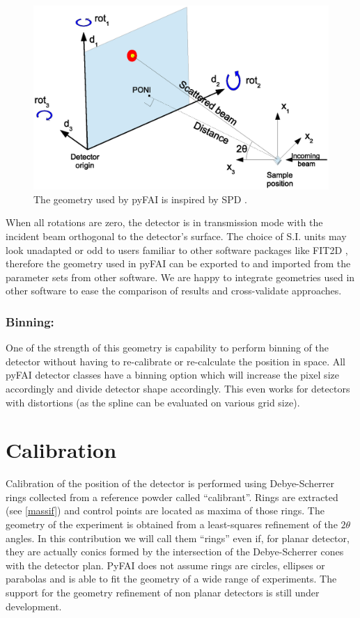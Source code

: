 \documentclass[preprint]{iucr}
\begin{document}
\begin{figure}
\label{PONI}
\begin{center}
\includegraphics[width=15cm]{PONI.eps}
\caption{The geometry used by pyFAI is inspired by SPD \cite{spd}.}
\end{center}
\end{figure}

When all rotations are zero, the detector is in transmission mode with the
incident beam orthogonal to the detector's surface.
The choice of S.I. units may look unadapted or odd to users familiar to
other software packages like FIT2D \cite{fit2d}, therefore the geometry used in
pyFAI can be exported to and imported from the parameter sets from other software.
We are happy to integrate geometries used in other software to ease the
comparison of results and cross-validate approaches.

\subsubsection{Binning:}
One of the strength of this geometry is capability to perform binning of the
detector without having to re-calibrate or re-calculate the position in space.
All pyFAI detector classes have a binning option which will increase the pixel
size accordingly and divide detector shape accordingly.
This even works for detectors with distortions (as the spline can be
evaluated on various grid size).

\section{Calibration}

Calibration of the position of the detector is performed using Debye-Scherrer
rings collected from a reference powder called ``calibrant''.
Rings are extracted (see \ref{massif}) and control points are located as maxima
of those rings.
The geometry of the experiment is obtained from a least-squares refinement of
the $2\theta$ angles.
In this contribution we will call them ``rings'' even if, for planar detector,
they are actually conics formed by the intersection of the Debye-Scherrer cones
with the detector plan.
PyFAI does not assume rings are circles, ellipses or parabolas and is able to
fit the geometry of a wide range of experiments.
The support for the geometry refinement of non planar detectors is still under
development.
\end{document}
